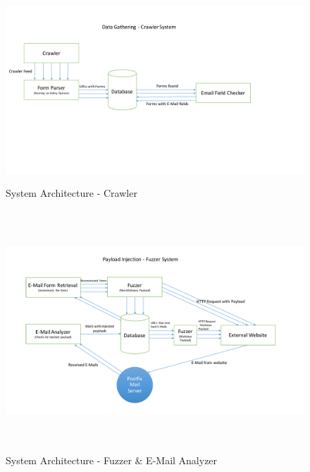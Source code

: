 \begin{figure}
     \centering
     \includegraphics[width=16cm, height=7cm]{System/crawler_design}
     \caption{System Architecture - Crawler}
     \label{fig:crawler}
 \end{figure}
 
 
 \begin{figure}
 	\centering
 	\includegraphics[width=16cm, height=9cm]{System/fuzzer_design}
 	\caption{System Architecture - Fuzzer {\&} E-Mail Analyzer}
 	\label{fig:fuzzer}
 \end{figure}
 